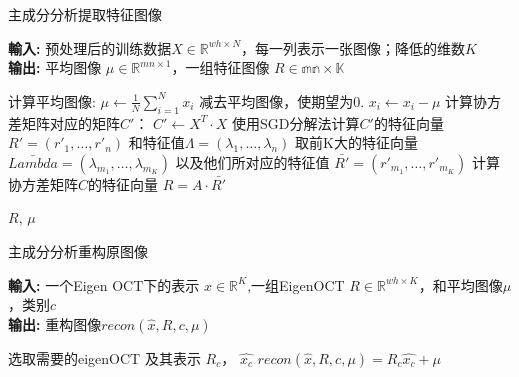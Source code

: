         \begin{algorithm}[t]
        \caption{主成分分析提取特征图像} %
        \hspace*{0.02in} {\bf 輸入:} %
        预处理后的训练数据$X \in \mathbb{R}^{wh \times N}$，每一列表示一张图像；降低的维数$K$ \\
        \hspace*{0.02in} {\bf 输出:} %
        平均图像 $\mu \in \mathbb{R}^{mn\times 1}$，一组特征图像 $R \in \mathbb {mn \times K}$
        \begin{algorithmic}[1]
        \State 计算平均图像: $\mu \leftarrow \frac{1}{N} \sum_{i=1}^N x_i$ %
        \State 减去平均图像，使期望为0. $x_i \leftarrow x_i - \mu$
        \State 计算协方差矩阵对应的矩阵$C'$： $C' \leftarrow X^T \cdot X$
        \State 使用SGD分解法计算$C'$的特征向量 $R' = (r'_1, \dots, r'_n)$ 和特征值$\Lambda = (\lambda_1, \dots, \lambda_n)$
        \State 取前K大的特征向量 $\bar{Lambda} = (\lambda_{m_1}, \dots, \lambda_{m_K})$ 以及他们所对应的特征值 $\bar {R'} = (r'_{m_1}, \dots, r'_{m_K})$
        \State 计算协方差矩阵$C$的特征向量 $R = A \cdot \bar{R'}$

        \State \Return $R$, $\mu$
        \end{algorithmic}
        \label{alg:eigenOCT}
        \end {algorithm}

        \begin{algorithm}[t]
        \caption{主成分分析重构原图像} %
        \hspace*{0.02in} {\bf 輸入:} %
        一个Eigen OCT下的表示 $\hat{x} \in \mathbb{R} ^{K} $,一组EigenOCT $R \in \mathbb{R} ^{wh \times K}$，和平均图像$\mu$，类别$c$\\
        \hspace*{0.02in} {\bf 输出:} %
        重构图像$recon(\hat{x}, R, c, \mu)$
        \begin{algorithmic}[1]
            \State 选取需要的eigenOCT 及其表示 $R_c$， $\hat{x_c}$
            \State $recon(\hat{x}, R, c, \mu) = R_c \hat{x_c} + \mu$
        \end{algorithmic}
        \label{alg:pca_recon}
        \end {algorithm}


